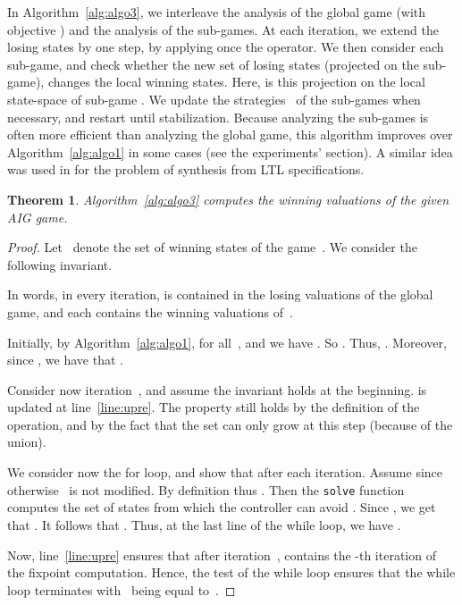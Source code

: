\documentclass[submission,copyright,creativecommons]{eptcs}
\newtheorem{theorem}{Theorem}
\begin{document}
In Algorithm~\ref{alg:algo3}, we interleave the analysis of the global game
(with objective ) and the analysis of the sub-games. At each iteration,
we extend the losing states  by one step, by applying once the 
operator.  We then consider each sub-game, and check whether the new set 
of losing states (projected on the sub-game), changes the local winning states.
Here,  is this projection on the local state-space of sub-game .  We
update the strategies~ of the sub-games when necessary, and restart
until stabilization.  Because analyzing the sub-games is often more efficient
than analyzing the global game, this algorithm improves over
Algorithm~\ref{alg:algo1} in some cases (see the experiments' section).  A
similar idea was used in \cite{FiliotJR11} for the problem of synthesis from LTL
specifications.


\begin{theorem}
  Algorithm~\ref{alg:algo3} computes the winning valuations of the given AIG game.
\end{theorem}
\begin{proof}
    Let~ denote the set of winning states of the game~.
    We consider the following invariant.
    
    In words, in every iteration, 
     is contained in the losing valuations of the global game, and
    each  contains the winning valuations of~.

    Initially, by Algorithm~\ref{alg:algo1}, 
    for all~, and we have
    . So .
    Thus, . 
    Moreover, since , we have
    that .


    Consider now iteration~, and assume the invariant holds at the
    beginning.  is updated at line~\ref{line:upre}.
    The property  still holds by the
    definition of the  operation, and by the fact that the set  
    can only grow at this step (because of the union).

    We consider now the for loop, and show that  after each
    iteration. Assume  since otherwise~ is not
    modified. By definition 
    thus . Then the \texttt{solve} function
    computes the set of states from which the controller can avoid 
    . Since , we get that .
    It follows that .
    Thus, at the last line of the while loop, we have .

    Now, line~\ref{line:upre} ensures that after iteration~,  contains 
    the -th iteration of the  fixpoint computation. Hence, the test  of the while loop ensures that the while loop terminates with~
    being equal to~.
\end{proof}
\end{document}
